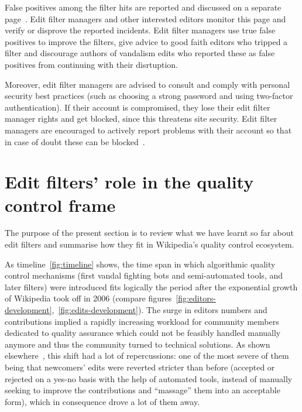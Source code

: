 False positives among the filter hits are reported and discussed on a separate page~\cite{Wikipedia:EditFilterFalsePositives}.
Edit filter managers and other interested editors monitor this page and verify or disprove the reported incidents.
Edit filter managers use true false positives to improve the filters, give advice to good faith editors who tripped a filter and discourage authors of vandalism edits who reported these as false positives from continuing with their disrtuption.

Moreover, edit filter managers are advised to consult and comply with personal security best practices (such as choosing a strong password and using two-factor authentication).
If their account is compromised, they lose their edit filter manager rights and get blocked, since this threatens site security.
Edit filter managers are encouraged to actively report problems with their account so that in case of doubt these can be blocked~\cite{Wikipedia:EditFilter}.


\section{Edit filters' role in the quality control frame}

The purpose of the present section is to review what we have learnt so far about edit filters and summarise how they fit in Wikipedia's quality control ecosystem.

As timeline~\ref{fig:timeline} shows, the time span in which algorithmic quality control mechanisms (first vandal fighting bots and semi-automated tools, and later filters) were introduced fits logically the period after the exponential growth of Wikipedia took off in 2006 (compare figures~\ref{fig:editors-development},~\ref{fig:edits-development}).
The surge in editors numbers and contributions implied a rapidly increasing workload for community members dedicated to quality assurance
which could not be feasibly handled manually anymore and thus the community turned to technical solutions.
As shown elsewhere~\cite{HalGeiMorRied2013}, this shift had a lot of repercussions:
one of the most severe of them being that newcomers' edits were reverted stricter than before (accepted or rejected on a yes-no basis with the help of automated tools, instead of manually seeking to improve the contributions and ``massage'' them into an acceptable form), which in consequence drove a lot of them away.

